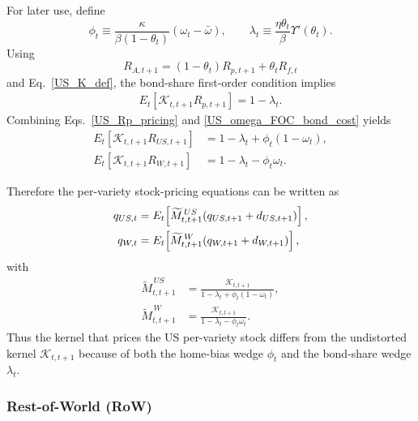 \documentclass{article}
\begin{document}
For later use, define
\[
\phi_t
\equiv
\frac{\kappa}{\beta(1-\theta_t)}(\omega_t-\bar\omega),
\qquad
\lambda_t
\equiv
\frac{\eta\theta_t}{\beta}\Upsilon'(\theta_t).
\]
Using
\[
R_{A,t+1}=(1-\theta_t)R_{p,t+1}+\theta_t R_{f,t}
\]
and Eq.~\eqref{US_K_def}, the bond-share first-order condition implies
\begin{align}\label{US_Rp_pricing}
E_t\!\left[\mathcal K_{t,t+1}R_{p,t+1}\right]
=
1-\lambda_t.
\end{align}
Combining Eqs.~\eqref{US_Rp_pricing} and \eqref{US_omega_FOC_bond_cost} yields
\begin{align}
E_t\!\left[\mathcal K_{t,t+1}R_{US,t+1}\right]
&=
1-\lambda_t+\phi_t(1-\omega_t),\label{US_RUS_pricing}\\
E_t\!\left[\mathcal K_{t,t+1}R_{W,t+1}\right]
&=
1-\lambda_t-\phi_t\omega_t.\label{US_RW_pricing}
\end{align}

Therefore the per-variety stock-pricing equations can be written as
\begin{align}
q_{US,t}
&=
E_t\!\left[\widetilde M^{\,US}_{t,t+1}(q_{US,t+1}+d_{US,t+1})\right],\label{US_AP_bond_cost}\\
q_{W,t}
&=
E_t\!\left[\widetilde M^{\,W}_{t,t+1}(q_{W,t+1}+d_{W,t+1})\right],\notag
\end{align}
with
\begin{align*}
\widetilde M^{\,US}_{t,t+1}
&=
\frac{\mathcal K_{t,t+1}}
{1-\lambda_t+\phi_t(1-\omega_t)},\\
\widetilde M^{\,W}_{t,t+1}
&=
\frac{\mathcal K_{t,t+1}}
{1-\lambda_t-\phi_t\omega_t}.
\end{align*}
Thus the kernel that prices the US per-variety stock differs from the undistorted kernel $\mathcal K_{t,t+1}$ because of both the home-bias wedge $\phi_t$ and the bond-share wedge $\lambda_t$.

\subsubsection{Rest-of-World (RoW)}
\end{document}
